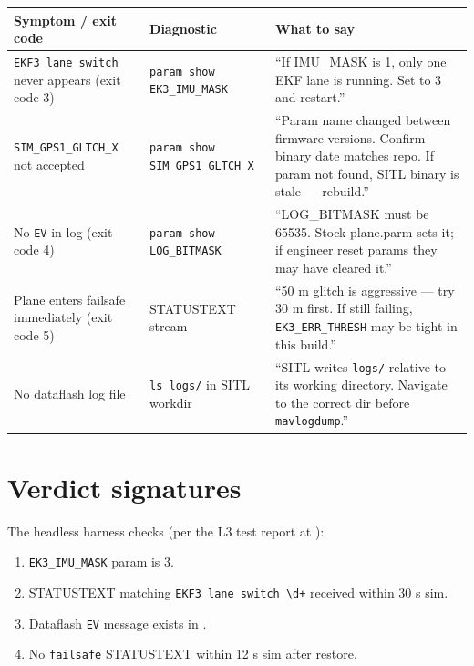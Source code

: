 \documentclass[a4paper,11pt,twoside]{article}
\begin{document}
\begin{center}\footnotesize
\begin{tabular}{|p{4.5cm}|p{4.0cm}|p{6.0cm}|}\hline
\textbf{Symptom / exit code} & \textbf{Diagnostic} & \textbf{What to say} \\ \hline
\texttt{EKF3 lane switch} never appears (exit code 3) & \texttt{param show EK3\_IMU\_MASK} & ``If IMU\_MASK is 1, only one EKF lane is running. Set to 3 and restart.'' \\ \hline
\texttt{SIM\_GPS1\_GLTCH\_X} not accepted & \texttt{param show SIM\_GPS1\_GLTCH\_X} & ``Param name changed between firmware versions. Confirm binary date matches repo. If param not found, SITL binary is stale --- rebuild.'' \\ \hline
No \texttt{EV} in log (exit code 4) & \texttt{param show LOG\_BITMASK} & ``LOG\_BITMASK must be 65535. Stock plane.parm sets it; if engineer reset params they may have cleared it.'' \\ \hline
Plane enters failsafe immediately (exit code 5) & STATUSTEXT stream & ``50 m glitch is aggressive --- try 30 m first. If still failing, \texttt{EK3\_ERR\_THRESH} may be tight in this build.'' \\ \hline
No dataflash log file & \texttt{ls logs/} in SITL workdir & ``SITL writes \texttt{logs/} relative to its working directory. Navigate to the correct dir before \texttt{mavlogdump}.'' \\ \hline
\end{tabular}
\end{center}

\section*{Verdict signatures}

The headless harness checks (per the L3 test report at ):

\begin{enumerate}
  \item \texttt{EK3\_IMU\_MASK} param is 3.
  \item STATUSTEXT matching \texttt{EKF3 lane switch \textbackslash d+} received within 30 s sim.
  \item Dataflash \texttt{EV} message exists in .
  \item No \texttt{failsafe} STATUSTEXT within 12 s sim after restore.
\end{enumerate}
\end{document}
